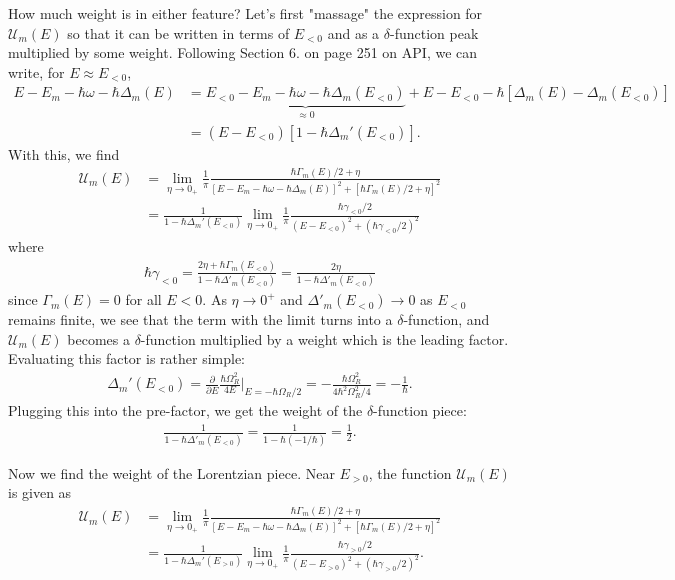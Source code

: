 \documentclass{article}
\theoremstyle{definition}
\newcommand{\p}{\partial}
\newcommand{\f}[2]{\frac{#1}{#2}}
\begin{document}
\begin{enumerate}[label=(\alph*)]
How much weight is in either feature? Let's first "massage" the expression for $\mathcal{U}_m(E)$ so that it can be written in terms of $E_{<0}$ and as a $\delta$-function peak multiplied by some weight. Following Section 6. on page 251 on API, we can write, for $E\approx E_{<0}$, 
\begin{align*}
E - E_m - \hbar \omega - \hbar \Delta_m(E) 
&= \underbrace{E_{<0} - E_m - \hbar \omega - \hbar \Delta_m(E_{<0})}_{\approx 0} + E - E_{<0} - \hbar [\Delta_m(E) - \Delta_m(E_{<0})] \\
&= (E - E_{<0}) [ 1 - \hbar \Delta_m'(E_{<0}) ].
\end{align*}
With this, we find
\begin{align*}
\mathcal{U}_m(E) 
&= \lim_{\eta \to 0_+} \f{1}{\pi} \f{\hbar \Gamma_m(E) / 2 + \eta}{ [E - E_{m} - \hbar \omega - \hbar \Delta_m(E)]^2 + [\hbar \Gamma_m(E) /2 + \eta]^2} \\
&= \f{1}{1 - \hbar \Delta_m'(E_{<0})} \lim_{\eta \to 0_+} \f{1}{\pi} \f{\hbar \gamma_{<0}/2}{(E-E_{<0})^2 + (\hbar \gamma_{<0}/2)^2}
\end{align*}
where
\begin{align*}
\hbar \gamma_{<0} = \f{2\eta + \hbar \Gamma_m(E_{<0})}{1 - \hbar \Delta'_m(E_{<0})} = \f{2\eta}{1 - \hbar \Delta'_m(E_{<0})} 
\end{align*}
since $\Gamma_m(E) = 0$ for all $E < 0$. As $\eta \to 0^+$ and  $\Delta'_m(E_{<0}) \to 0$ as $E_{<0}$ remains finite, we see that the term with the limit turns into a $\delta$-function, and $\mathcal{U}_m(E)$ becomes a $\delta$-function multiplied by a weight which is the leading factor. Evaluating this factor is rather simple:
\begin{align*}
\Delta_m'(E_{<0}) = \f{\p}{\p {E}} \f{\hbar \Omega_R^2}{4E} \bigg\vert_{E = -\hbar \Omega_R/2} =  -\f{\hbar \Omega_R^2}{4\hbar^2 \Omega_R^2/4 } =  -\f{1}{\hbar}.
\end{align*}
Plugging this into the pre-factor, we get the weight of the $\delta$-function piece:
\begin{align*}
\f{1}{1 - \hbar \Delta'_m(E_{<0})} = \f{1}{1 - \hbar (-1/\hbar)} = \f{1}{2}.
\end{align*}

Now we find the weight of the Lorentzian piece. Near $E_{>0}$, the function $\mathcal{U}_m(E)$ is given as 
\begin{align*}
\mathcal{U}_m(E) 
&= \lim_{\eta \to 0_+} \f{1}{\pi} \f{\hbar \Gamma_m(E) / 2 + \eta}{ [E - E_{m} - \hbar \omega - \hbar \Delta_m(E)]^2 + [\hbar \Gamma_m(E) /2 + \eta]^2} \\
&= \f{1}{1 - \hbar \Delta_m'(E_{>0})} \lim_{\eta \to 0_+} \f{1}{\pi} \f{\hbar \gamma_{>0}/2}{(E-E_{>0})^2 + (\hbar \gamma_{>0}/2)^2}.
\end{align*}


\end{enumerate}
\end{document}
